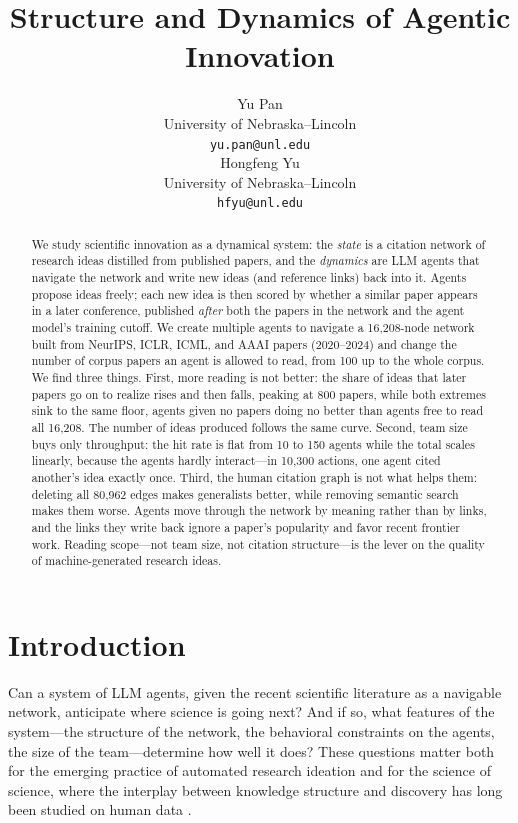 \documentclass{article} %
\title{Structure and Dynamics of Agentic Innovation}
\author{Yu Pan \\
University of Nebraska--Lincoln \\
\texttt{yu.pan@unl.edu} \\
\And
Hongfeng Yu \\
University of Nebraska--Lincoln \\
\texttt{hfyu@unl.edu}}
\begin{document}
\maketitle
{}

\begin{abstract}
We study scientific innovation as a dynamical system: the \emph{state} is a
citation network of research ideas distilled from published papers, and the
\emph{dynamics} are LLM agents that navigate the network and write new ideas
(and reference links) back into it. Agents propose ideas freely; each new idea is then
scored by whether a similar paper appears in a later conference, published
\emph{after} both the papers in the network and the agent model's training
cutoff. 
We create multiple agents to navigate a
16{,}208-node network built from NeurIPS, ICLR, ICML, and AAAI papers
(2020--2024) and change the number
of corpus papers an agent is allowed to read, from 100 up to the whole
corpus. We find three things. First, more reading is not better: the share of
ideas that later papers go on to realize rises and then falls, peaking at 800
papers, while both extremes sink to the same
floor, agents given no papers doing no better than agents free to read
all 16{,}208. The number of ideas produced follows the same curve.
Second, team size buys only throughput: the hit rate is flat from 10 to 150
agents while the total scales linearly, because the agents hardly
interact---in 10{,}300 actions, one agent cited another's idea exactly once.
Third, the human citation graph is not what helps them: deleting all 80{,}962
edges makes generalists better, while removing semantic
search makes them worse. Agents move through the network by meaning rather
than by links, and the links they write back ignore a paper's popularity and
favor recent frontier work. Reading scope---not team size, not citation
structure---is the lever on the quality of machine-generated research ideas.
\end{abstract}

\section{Introduction}

Can a system of LLM agents, given the recent scientific literature as a
navigable network, anticipate where science is going next? And if so, what
features of the system---the structure of the network, the behavioral
constraints on the agents, the size of the team---determine how well it
does? These questions matter both for the emerging practice of automated
research ideation \citep{lu2024aiscientist,si2024llmideas} and for the
science of science, where the interplay between knowledge structure and
discovery has long been studied on human data
\citep{fortunato2018science,uzzi2013atypical,wu2019teams}.
\end{document}
